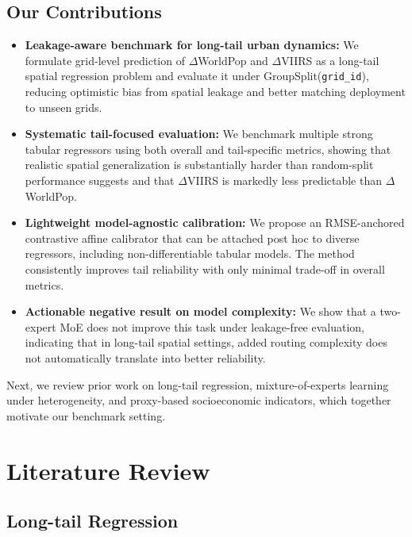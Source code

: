 \documentclass[pdflatex,sn-basic,Numbered]{sn-jnl}
\begin{document}
\subsection{Our Contributions}
\begin{itemize}
    \item \textbf{Leakage-aware benchmark for long-tail urban dynamics:} We formulate grid-level prediction of $\Delta$WorldPop and $\Delta$VIIRS as a long-tail spatial regression problem and evaluate it under GroupSplit(\texttt{grid\_id}), reducing optimistic bias from spatial leakage and better matching deployment to unseen grids.

    \item \textbf{Systematic tail-focused evaluation:} We benchmark multiple strong tabular regressors using both overall and tail-specific metrics, showing that realistic spatial generalization is substantially harder than random-split performance suggests and that $\Delta$VIIRS is markedly less predictable than $\Delta$WorldPop.

    \item \textbf{Lightweight model-agnostic calibration:} We propose an RMSE-anchored contrastive affine calibrator that can be attached post hoc to diverse regressors, including non-differentiable tabular models. The method consistently improves tail reliability with only minimal trade-off in overall metrics.

    \item \textbf{Actionable negative result on model complexity:} We show that a two-expert MoE does not improve this task under leakage-free evaluation, indicating that in long-tail spatial settings, added routing complexity does not automatically translate into better reliability.
\end{itemize}

Next, we review prior work on long-tail regression, mixture-of-experts learning under heterogeneity, and proxy-based socioeconomic indicators, which together motivate our benchmark setting.

\section{Literature Review}
\subsection{Long-tail Regression}
\end{document}
